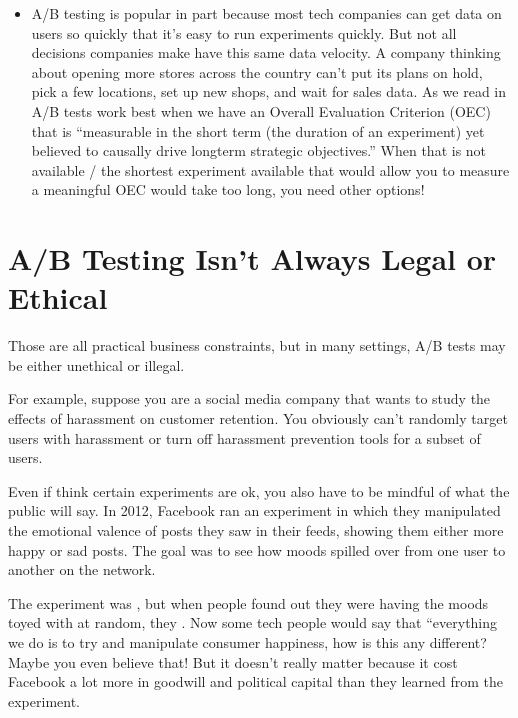 \documentclass[letterpaper,10pt,english]{jupyterBook}
\begin{document}
\begin{itemize}
\item {} 
\sphinxAtStartPar
{} A/B testing is popular in part because most tech companies can get data on users so quickly that it’s easy to run experiments quickly. But not all decisions companies make have this same data velocity. A company thinking about opening more stores across the country can’t put its plans on hold, pick a few locations, set up new shops, and wait for sales data. As we read in  A/B tests work best when we have an Overall Evaluation Criterion (OEC) that is “measurable in the short term (the duration of an experiment) yet believed to causally drive long\sphinxhyphen{}term strategic objectives.” When that is not available / the shortest experiment available that would allow you to measure a meaningful OEC would take too long, you need other options!

\end{itemize}


\section{A/B Testing Isn’t Always Legal or Ethical}
\label{\detokenize{30_questions/50_causal_beyond_ab:a-b-testing-isn-t-always-legal-or-ethical}}
\sphinxAtStartPar
Those are all practical business constraints, but in many settings, A/B tests may be either unethical or illegal.

\sphinxAtStartPar
For example, suppose you are a social media company that wants to study the effects of harassment on customer retention. You obviously can’t randomly target users with harassment or turn off harassment prevention tools for a subset of users.

\sphinxAtStartPar
Even if  think certain experiments are ok, you also have to be mindful of what the public will say. In 2012, Facebook ran an experiment in which they manipulated the emotional valence of posts they saw in their feeds, showing them either more happy or sad posts. The goal was to see how moods spilled over from one user to another on the network.

\sphinxAtStartPar
The experiment was , but when people found out they were having the moods toyed with at random, they .  Now some tech people would say that “everything we do is to try and manipulate consumer happiness, how is this any different? Maybe you even believe that! But it doesn’t really matter because it cost Facebook a lot more in goodwill and political capital than they learned from the experiment.
\end{document}
